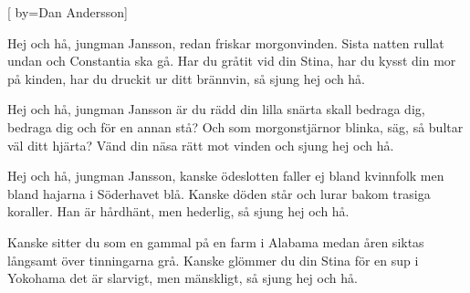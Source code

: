 


[ 	%
	by={Dan Andersson}]		%
	
\beginverse*		%
Hej och hå, jungman Jansson,
redan friskar morgonvinden.
Sista natten rullat undan och 
Constantia ska gå.
Har du gråtit vid din Stina,
har du kysst din mor på kinden,
har du druckit ur ditt brännvin,
så sjung hej och hå.
\endverse			%

\beginverse*		%
Hej och hå, jungman Jansson 
är du rädd din lilla snärta
skall bedraga dig, bedraga dig 
och för en annan stå?
Och som morgonstjärnor blinka, 
säg, så bultar väl ditt hjärta?
Vänd din näsa rätt mot vinden 
och sjung hej och hå.
\endverse			%

\beginverse*		%
Hej och hå, jungman Jansson, 
kanske ödeslotten faller
ej bland kvinnfolk men bland hajarna 
i Söderhavet blå.
Kanske döden står och lurar 
bakom trasiga koraller.
Han är hårdhänt, men hederlig, 
så sjung hej och hå.
\endverse			%

\beginverse*		%
Kanske sitter du som en gammal 
på en farm i Alabama
medan åren siktas långsamt 
över tinningarna grå.
Kanske glömmer du din Stina 
för en sup i Yokohama
det är slarvigt, men mänskligt, 
så sjung hej och hå.
\endverse			%
\endsong			%
